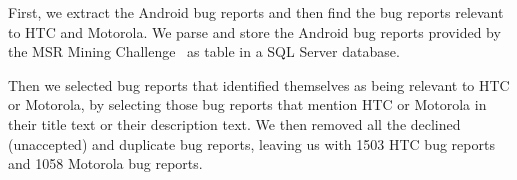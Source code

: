 \documentclass[10pt, conference, compsocconf]{IEEEtran}
\begin{document}

First, we
extract the Android bug reports and then find
the bug reports relevant to HTC and Motorola.  We parse and store the
Android bug reports provided by the MSR Mining
Challenge~\cite{MSRChallenge2012} as table in a SQL Server database.


Then we selected bug reports that identified themselves as being
relevant to HTC or Motorola, by selecting those bug reports that mention HTC or
Motorola in their title text or their description text.
We then removed all the declined (unaccepted) and duplicate bug reports, leaving us
with 1503 HTC bug reports and 1058 Motorola bug reports.
\end{document}
